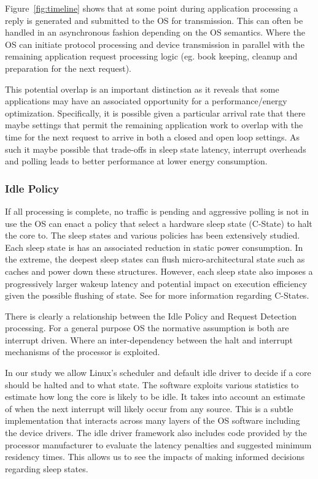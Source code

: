Figure~\ref{fig:timeline} shows that at some point during application processing a reply is generated and submitted to the OS for transmission.  This can often be handled in an asynchronous fashion depending on the OS semantics.  Where the OS can initiate protocol processing and device transmission in parallel with the remaining application request processing logic (eg. book keeping, cleanup and preparation for the next request).

This potential overlap is an important distinction as it reveals that some applications may have an associated opportunity for a performance/energy optimization.  Specifically, it is possible given a particular arrival rate that there maybe settings that permit the remaining application work to overlap with the time for the next request to arrive in both a closed and open loop settings.  As such it maybe possible that trade-offs in sleep state latency, interrupt overheads and polling leads to better performance at lower energy consumption.  

\subsubsection{Idle Policy}
\label{sec:workflow:idlepolicy}

If all processing is complete, no traffic is pending and aggressive polling is not in use the OS can enact a policy that select a hardware sleep state (C-State) to halt the core to.  The sleep states and various policies has been extensively studied\cite{}.  Each sleep state is has an associated reduction in static power consumption. In the extreme, the deepest sleep states can flush micro-architectural state such as caches and power down these structures. However, each sleep state also imposes a progressively larger wakeup latency and potential impact on execution efficiency given the possible flushing of state. See \cite{brooks,udpm} for more information regarding C-States. 


There is clearly a relationship between the Idle Policy and Request Detection processing.  For a general purpose OS the normative assumption is both are interrupt driven.  Where an inter-dependency between the halt and interrupt mechanisms of the processor is exploited.  

In our study we allow Linux's scheduler and default idle driver to decide if a core should be halted and to what state.  The software exploits various statistics to estimate how long the core is likely to be idle. It takes into account an estimate of when the next interrupt will likely occur from any source.  This is a subtle implementation that interacts across many layers of the OS software including the device drivers.  The idle driver framework also includes code provided by the processor manufacturer to evaluate the latency penalties and suggested minimum residency times.  This allows us to see the impacts of making informed decisions regarding sleep states.  

